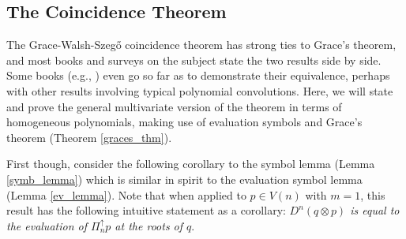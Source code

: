 \documentclass{article}
\theoremstyle{definition}
\theoremstyle{plain}
\begin{document}
\subsection{The Coincidence Theorem}

The Grace-Walsh-Szeg{\H{o}} coincidence theorem has strong ties to Grace's theorem, and most books and surveys on the subject state the two results side by side. Some books (e.g., \cite{rahman2002anthpoly}) even go so far as to demonstrate their equivalence, perhaps with other results involving typical polynomial convolutions. Here, we will state and prove the general multivariate version of the theorem in terms of homogeneous polynomials, making use of evaluation symbols and Grace's theorem (Theorem \ref{graces_thm}).

First though, consider the following corollary to the symbol lemma (Lemma \ref{symb_lemma}) which is similar in spirit to the evaluation symbol lemma (Lemma \ref{ev_lemma}). Note that when applied to $p \in V(n)$ with $m=1$, this result has the following intuitive statement as a corollary: \emph{$D^n(q \otimes p)$ is equal to the evaluation of $\Pi_n^\uparrow p$ at the roots of $q$}.
\end{document}
